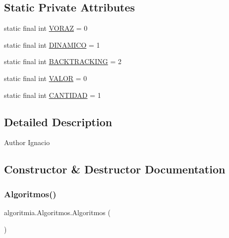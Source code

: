 \subsection*{Static Private Attributes}
\begin{DoxyCompactItemize}
\item 
static final int \mbox{\hyperlink{classalgoritmia_1_1_algoritmos_a0a9ba4978b5b882c24472df7d5d97010}{V\+O\+R\+AZ}} = 0
\item 
static final int \mbox{\hyperlink{classalgoritmia_1_1_algoritmos_a1b1c4d0c3b1fc5aabe419e2951b9ed06}{D\+I\+N\+A\+M\+I\+CO}} = 1
\item 
static final int \mbox{\hyperlink{classalgoritmia_1_1_algoritmos_a25b962b4dc61840abf40b275011197a5}{B\+A\+C\+K\+T\+R\+A\+C\+K\+I\+NG}} = 2
\item 
static final int \mbox{\hyperlink{classalgoritmia_1_1_algoritmos_ad95879cb27d38d149e733992fb487933}{V\+A\+L\+OR}} = 0
\item 
static final int \mbox{\hyperlink{classalgoritmia_1_1_algoritmos_a42fcc64ce734e24638709e966f66e63b}{C\+A\+N\+T\+I\+D\+AD}} = 1
\end{DoxyCompactItemize}


\subsection{Detailed Description}
\begin{DoxyAuthor}{Author}
Ignacio 
\end{DoxyAuthor}


\subsection{Constructor \& Destructor Documentation}
\mbox{\label{classalgoritmia_1_1_algoritmos_a1ecfcbbdfa9fe28357385a28d24677e9}} 
\subsubsection{\texorpdfstring{Algoritmos()}{Algoritmos()}}
{\footnotesize\ttfamily algoritmia.\+Algoritmos.\+Algoritmos (\begin{DoxyParamCaption}{ }\end{DoxyParamCaption})\hspace{0.3cm}{\ttfamily [inline]}}


